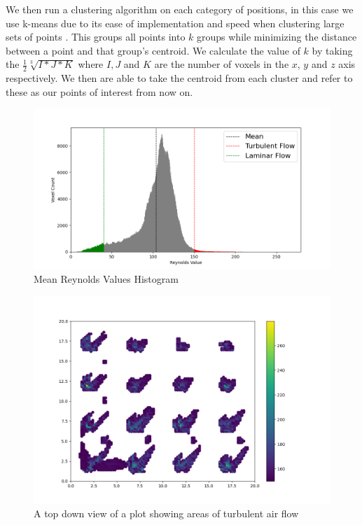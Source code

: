 We then run a clustering algorithm on each category of positions, in this case we use k-means due to its ease of implementation and speed when clustering large sets of points \cite{HDBScan}. This groups all points into \ensuremath{k} groups while minimizing the distance between a point and that group's centroid. We calculate the value of \ensuremath{k} by taking the \ensuremath{\frac{1}{2}\sqrt[3]{I*J*K}} where \ensuremath{I,J} and \ensuremath{K} are the number of voxels in the \ensuremath{x}, \ensuremath{y} and \ensuremath{z} axis respectively. We then are able to take the centroid from each cluster and  refer to these as our points of interest from now on. 


\begin{figure}
\centering
\includegraphics[scale=.35]{Figures/Hist4_11.png}
\decoRule
\caption[Reynolds Number Histogram]{Mean Reynolds Values Histogram}
\label{fig:MHistgram}
\end{figure}

\begin{figure}
\centering
\includegraphics[scale=.35]{Figures/Turb2D_4_11.png}
\decoRule
\caption[Turbulent Air Flow Scatter Plot]{A top down view of a plot showing areas of turbulent air flow}
\label{fig:MTurbulentflow}
\end{figure}
